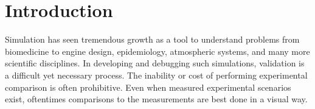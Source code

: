 
\section{Introduction}





Simulation has seen tremendous growth as a tool to understand problems
from biomedicine to engine design, epidemiology, atmospheric systems,
and many more scientific disciplines. In developing and debugging
such simulations, validation is a difficult yet necessary process.
The inability or cost of performing experimental comparison is often
prohibitive.  Even when measured experimental scenarios exist,
oftentimes comparisons to the measurements are best done in a visual
way.



